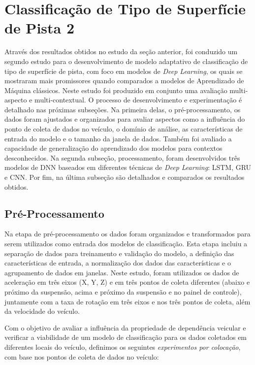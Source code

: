 \chapter{Classificação de Tipo de Superfície de Pista 2}
\label{cap:classificacao_tipo_superficie_2}

Através dos resultados obtidos no estudo da seção anterior, foi conduzido um segundo estudo para o desenvolvimento de modelo adaptativo de classificação de tipo de superfície de pista, com foco em modelos de \textit{Deep Learning}, os quais se mostraram mais promissores quando comparados a modelos de Aprendizado de Máquina clássicos. Neste estudo foi produzido em conjunto uma avaliação multi-aspecto e multi-contextual. O processo de desenvolvimento e experimentação é detalhado nas próximas subseções. Na primeira delas, o pré-processamento, os dados foram ajustados e organizados para avaliar aspectos como a influência do ponto de coleta de dados no veículo, o domínio de análise, as características de entrada do modelo e o tamanho da janela de dados. Também foi avaliado a capacidade de generalização do aprendizado dos modelos para contextos desconhecidos. Na segunda subseção, processamento, foram desenvolvidos três modelos de DNN baseados em diferentes técnicas de \textit{Deep Learning}: LSTM, GRU e CNN. Por fim, na última subseção são detalhados e comparados os resultados obtidos.

\section{Pré-Processamento}

Na etapa de pré-processamento os dados foram organizados e transformados para serem utilizados como entrada dos modelos de classificação. Esta etapa incluiu a separação de dados para treinamento e validação do modelo, a definição das características de entrada, a normalização dos dados das características e o agrupamento de dados em janelas. Neste estudo, foram utilizados os dados de aceleração em três eixos (X, Y, Z) e em três pontos de coleta diferentes (abaixo e próximo da suspensão, acima e próximo da suspensão e no painel de controle), juntamente com a taxa de rotação em três eixos e nos três pontos de coleta, além da velocidade do veículo.

Com o objetivo de avaliar a influência da propriedade de dependência veicular e verificar a viabilidade de um modelo de classificação para os dados coletados em diferentes locais do veículo, definimos os seguintes \emph{experimentos por colocação}, com base nos pontos de coleta de dados no veículo:

